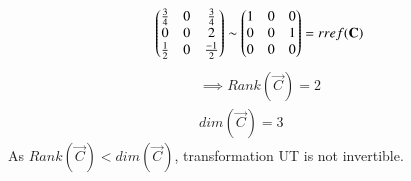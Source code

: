 \begin{enumerate}
\begin{align}
\begin{pmatrix}\frac{3}{4}&0&\frac{3}{4}\\0&0&2\\\frac{1}{2}&0&\frac{-1}{2}\end{pmatrix} \sim \begin{pmatrix}1&0&0\\0&0&1\\0&0&0\end{pmatrix}=rref(\mathbf{C})
\end{align}
\begin{align}
\implies Rank(\vec{C})=2 \label{eq:solutions/3/2/6/RankC}\\
dim(\vec{C})=3
\end{align}
As $Rank(\vec{C})<dim(\vec{C})$, transformation UT is not invertible.
\end{enumerate}
